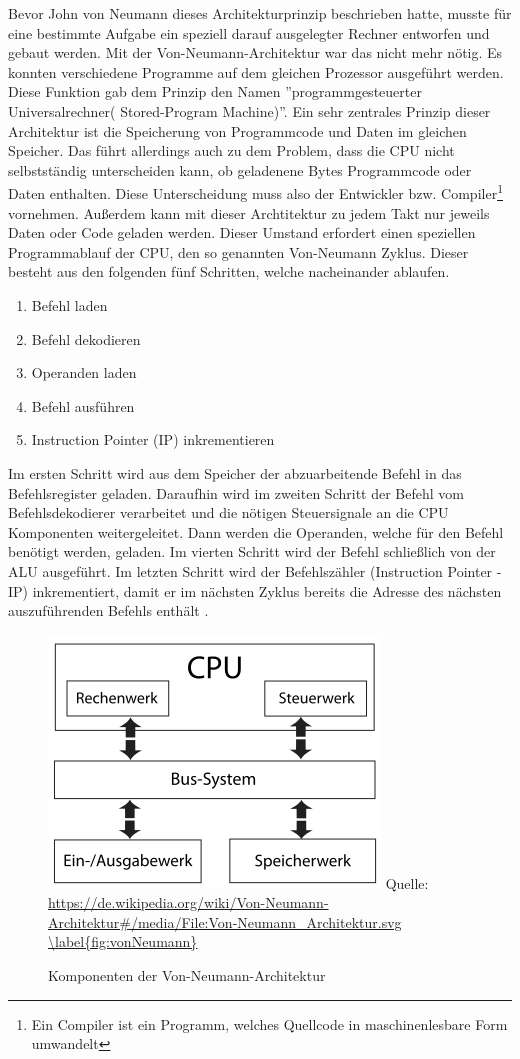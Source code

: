 \documentclass[a4paper,12pt]{article}
\begin{document}
\noindent Bevor John von Neumann dieses Architekturprinzip beschrieben hatte, musste für eine bestimmte Aufgabe ein speziell darauf ausgelegter Rechner entworfen und gebaut werden. Mit der Von-Neumann-Architektur war das nicht mehr nötig. Es konnten verschiedene Programme auf dem gleichen Prozessor ausgeführt werden. Diese Funktion gab dem Prinzip den Namen ''programmgesteuerter Universalrechner( Stored-Program Machine)''\cite{TaschenbuchMikroprozessortechnik}.
Ein sehr zentrales Prinzip dieser Architektur ist die Speicherung von Programmcode und Daten im gleichen Speicher. Das führt allerdings auch zu dem Problem, dass die CPU nicht selbstständig unterscheiden kann, ob geladenene Bytes Programmcode oder Daten enthalten. Diese Unterscheidung muss also der Entwickler bzw. Compiler\footnote{Ein Compiler ist ein Programm, welches Quellcode in maschinenlesbare Form umwandelt} vornehmen. Außerdem kann mit dieser Archtitektur zu jedem Takt nur jeweils Daten oder Code geladen werden. Dieser Umstand erfordert einen speziellen Programmablauf der CPU, den so genannten Von-Neumann Zyklus. Dieser besteht aus den folgenden fünf Schritten, welche nacheinander ablaufen.

\begin{enumerate}
\item Befehl laden 
\item Befehl dekodieren
\item Operanden laden
\item Befehl ausführen
\item Instruction Pointer (IP) inkrementieren
\end{enumerate}
Im ersten Schritt wird aus dem Speicher der abzuarbeitende Befehl in das Befehlsregister geladen. Daraufhin wird im zweiten Schritt der Befehl vom Befehlsdekodierer verarbeitet und die nötigen Steuersignale an die CPU Komponenten weitergeleitet. Dann werden die Operanden, welche für den Befehl benötigt werden, geladen. Im vierten Schritt wird der Befehl schließlich von der ALU ausgeführt. Im letzten Schritt wird der Befehlszähler (Instruction Pointer - IP) inkrementiert, damit er im nächsten Zyklus bereits die Adresse des nächsten auszuführenden Befehls enthält \cite{unikoelnvnz}.

\begin{figure}[!htb]
\centering
\includegraphics[scale=0.60]{Von-Neumann_Architektur}
\small Quelle: \url{https://de.wikipedia.org/wiki/Von-Neumann-Architektur#/media/File:Von-Neumann_Architektur.svg
\label{fig:vonNeumann}}
\caption{Komponenten der Von-Neumann-Architektur}
\end{figure}
\end{document}
